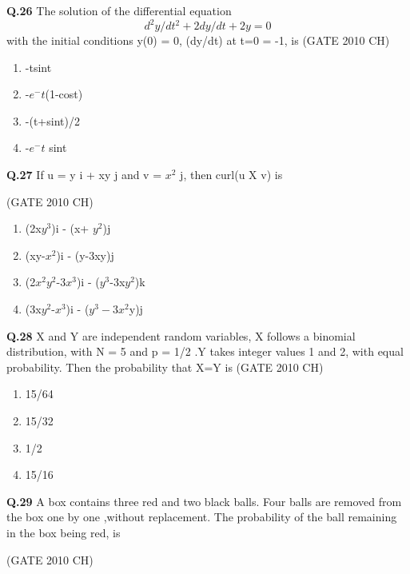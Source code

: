 \documentclass[journal,12pt,onecolumn]{exam}
\theoremstyle{remark}
\begin{document}
  \noindent
  \textbf{Q.26}
   The solution of the differential equation
   \begin{equation}
       d^2y/dt^2 + 2dy/dt + 2y = 0
   \end{equation}
   with the initial conditions y(0) = 0, (dy/dt) at t=0 = -1, is
\hfill{(GATE 2010 CH)}\\

\begin{enumerate}
    \item -tsint
    \item -$e^-t$(1-cost)\\
    \item -(t+sint)/2
    \item -$e^-t$ sint
\end{enumerate}


\noindent
\textbf{Q.27}
 If u = y i + xy j and v = $x^2$ j, then curl(u X v) is

 \hfill{(GATE 2010 CH)}\\
 
 \begin{enumerate}
     \item (2x$y^3$)i - (x+ $y^2$)j
     \item (xy-$x^2$)i - (y-3xy)j
     \item (2$x^2y^2$-3$x^3$)i - ($y^3$-3x$y^2$)k
     \item (3x$y^2$-$x^3$)i - ($y^3-3x^2$y)j
 \end{enumerate}

\noindent
\textbf{Q.28}
 X and Y are independent random variables, X follows a binomial distribution, with N = 5 and p = 1/2 .Y takes integer values 1 and 2, with equal probability. Then the probability that X=Y is
 \hfill{(GATE 2010 CH)}\\

 \begin{enumerate}
     \item 15/64
     \item 15/32
     \item 1/2
     \item 15/16
     
 \end{enumerate}

 \noindent
 \textbf{Q.29}
  A box contains three red and two black balls. Four balls are removed from the box one by one ,without replacement. The probability of the ball remaining in the box being red, is

  \hfill{(GATE 2010 CH)}\\
\end{document}
